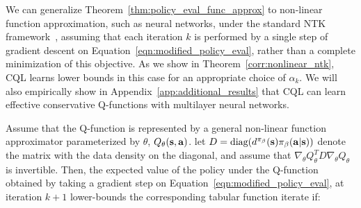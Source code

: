 We can generalize Theorem~\ref{thm:policy_eval_func_approx} to non-linear function approximation, such as neural networks, {under the standard NTK framework~\citep{ntk}}, assuming that each iteration $k$ is performed by a single step of gradient descent on Equation~\ref{eqn:modified_policy_eval}, rather than a complete minimization of this objective. As we show in Theorem~\ref{corr:nonlinear_ntk}, CQL learns lower bounds in this case for an appropriate choice of $\alpha_k$. We will also empirically show in Appendix~\ref{app:additional_results} that CQL can learn effective conservative Q-functions with multilayer neural networks.

\begin{theorem}
\label{corr:nonlinear_ntk}
Assume that the Q-function is represented by a general non-linear function approximator parameterized by $\theta$, $Q_\theta(\mathbf{s}, \mathbf{a})$. let $D = \text{diag}(d^{\pi_\beta}(\mathbf{s}) {\pi_\beta}(\mathbf{a}|\mathbf{s}))$ denote the matrix with the data density on the diagonal, and assume that $\nabla_\theta Q_\theta^T D \nabla_\theta Q_\theta$ is invertible. Then, the expected value of the policy under the Q-function obtained by taking a gradient step on Equation~\ref{eqn:modified_policy_eval}, at iteration $k+1$ lower-bounds the corresponding tabular function iterate if: 
\end{theorem}

